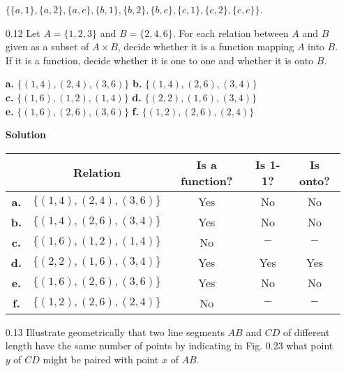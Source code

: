 \begin{enumerate}
      $\{\{a, 1\}, \{a, 2\}, \{a, c\}, \{b, 1\}, \{b, 2\},
       \{b, c\}, \{c, 1\}, \{c, 2\}, \{c, c\}\}$.
   \item[0.12] Let $A = \{1, 2, 3\}$ and $B = \{2, 4, 6\}$. For each relation
               between $A$ and $B$ given as a subset of $A \times B$, decide
               whether it is a function mapping $A$ into $B$. If it is a 
               function, decide whether it is one to one and whether it is onto
               $B$.

               \textbf{a.} $\{(1,4),(2,4),(3,6)\}$
               \qquad\qquad\qquad\qquad\qquad\qquad\qquad 
               \textbf{b.} $\{(1,4),(2,6),(3,4)\}$ \\
               \textbf{c.} $\{(1,6),(1,2),(1,4)\}$
               \qquad\qquad\qquad\qquad\qquad\qquad\qquad 
               \textbf{d.} $\{(2,2),(1,6),(3,4)\}$ \\
               \textbf{e.} $\{(1,6),(2,6),(3,6)\}$
               \qquad\qquad\qquad\qquad\qquad\qquad\qquad 
               \textbf{f.} $\{(1,2),(2,6),(2,4)\}$

      \textbf{Solution}

      \begin{tabular}{@{}|c|c|c|c|c|@{}}
         \hline & Relation & Is a function? & Is 1-1? & Is onto? \\ \hline
         \textbf{a.} & $\{(1,4),(2,4),(3,6)\}$ & Yes & No & No\\ \hline
         \textbf{b.} & $\{(1,4),(2,6),(3,4)\}$ & Yes & No & No\\ \hline
         \textbf{c.} & $\{(1,6),(1,2),(1,4)\}$ & No & $-$ & $-$\\ \hline
         \textbf{d.} & $\{(2,2),(1,6),(3,4)\}$ & Yes & Yes & Yes\\ \hline
         \textbf{e.} & $\{(1,6),(2,6),(3,6)\}$ & Yes & No & No\\ \hline
         \textbf{f.} & $\{(1,2),(2,6),(2,4)\}$ & No & $-$ & $-$\\ \hline
      \end{tabular}
   \item[0.13] Illustrate geometrically that two line segments $AB$ and $CD$ of
               different length have the same number of points by indicating in
               Fig. 0.23 what point $y$ of $CD$ might be paired with point $x$
               of $AB$.


\end{enumerate}
